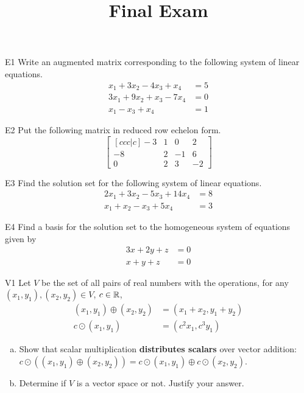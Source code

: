 \documentclass{sbgLAexam}
\title{Final Exam}
\begin{document}
\begin{problem}{E1}
Write an augmented matrix corresponding to the following system of linear equations.
\begin{align*}
x_1+3x_2-4x_3 +x_4 &= 5 \\
3x_1+9x_2+x_3-7x_4 &= 0 \\
x_1-x_3 +x_4 &= 1
\end{align*}
\end{problem}

\begin{problem}{E2}
Put the following matrix in reduced row echelon form.
$$\begin{bmatrix}[ccc|c] -3 & 1 & 0 & 2 \\ -8 & 2 & -1 & 6 \\ 0 & 2 & 3 & -2 \end{bmatrix}$$
\end{problem}
\newpage

\begin{problem}{E3}
Find the solution set for the following system of linear equations.
\begin{align*}
2x_1+3x_2-5x_3+14x_4 &= 8 \\
x_1+x_2-x_3+5x_4&= 3
\end{align*}
\end{problem}

\begin{problem}{E4}
Find a basis for the solution set to the homogeneous system of equations
given by
\begin{align*}
3x+2y+z &= 0 \\
x+y+z &= 0
\end{align*}
\end{problem}
\newpage

\begin{problem}{V1}
Let $V$ be the set of all pairs of real numbers with the operations, for any $(x_1,y_1), (x_2,y_2) \in V$, $c \in \mathbb{R}$,
\begin{align*}
(x_1,y_1) \oplus (x_2,y_2) &= (x_1+x_2,y_1+y_2) \\
c \odot (x_1,y_1) &= (c^2x_1, c^3y_1)
\end{align*}
\begin{enumerate}[(a)]
\item Show that scalar multiplication \textbf{distributes scalars} over
      vector addition:
      \(c\odot((x_1,y_1) \oplus (x_2,y_2))=
      c\odot(x_1,y_1) \oplus c\odot(x_2,y_2)\).
\item Determine if $V$ is a vector space or not.  Justify your answer.
\end{enumerate}
\end{problem}
\end{document}
